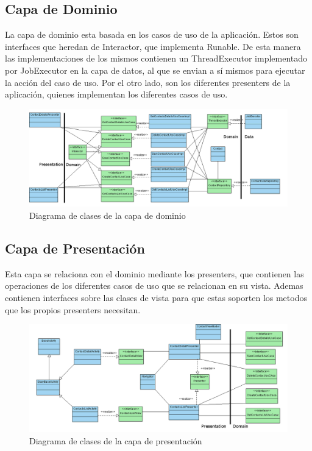 \documentclass[../pfc.tex]{subfiles}
\begin{document}
	\subsection{Capa de Dominio}
	
	La capa de dominio esta basada en los casos de uso de la aplicación. Estos son interfaces que heredan de Interactor, que implementa Runable. De esta manera las implementaciones de los mismos contienen un ThreadExecutor implementado por JobExecutor en la capa de datos, al que se envian a sí­ mismos para ejecutar la acción del caso de uso. Por el otro lado, son los diferentes presenters de la aplicación, quienes implementan los diferentes casos de uso. 
		
			\begin{figure}[H]
				\centering
				\includegraphics[width=0.8\linewidth]{../images/DomainClasesDiagram}
				\caption{Diagrama de clases de la capa de dominio}
				\label{fig:Clases de la capa Domain}
			\end{figure}
		
	\subsection{Capa de Presentación}
	
	Esta capa se relaciona con el dominio mediante los presenters, que contienen las operaciones de los diferentes casos de uso que se relacionan en su vista. Ademas contienen interfaces sobre las clases de vista para que estas soporten los metodos que los propios presenters necesitan.
	
			\begin{figure}[H]
				\centering
				\includegraphics[width=0.8\linewidth]{../images/PresentationClasesDiagram}
				\caption{Diagrama de clases de la capa de presentación}
				\label{fig:Clases de la capa Presentation}
			\end{figure}
	
\end{document}
